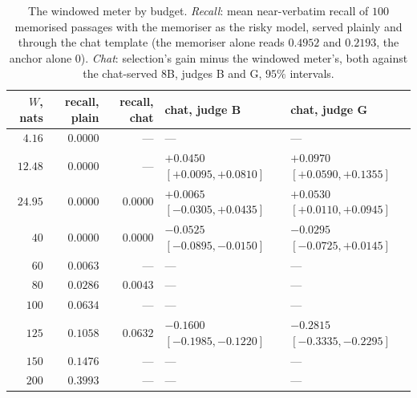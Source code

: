 \begin{table}[ht]
\centering\footnotesize
\caption{The windowed meter by budget. \emph{Recall}: mean near-verbatim recall of $100$ memorised passages
with the memoriser as the risky model, served plainly and through the chat template (the memoriser alone
reads $0.4952$ and $0.2193$, the anchor alone $0$). \emph{Chat}: selection's gain minus the windowed meter's,
both against the chat-served $8$B, judges B and G, $95\%$ intervals.}
\label{tab:windowed}
\setlength{\tabcolsep}{4pt}
\begin{tabular}{@{}rrrll@{}}
\toprule
$W$, nats & recall, plain & recall, chat & chat, judge B & chat, judge G \\
\midrule
$4.16$ & $0.0000$ & --- & --- & --- \\
$12.48$ & $0.0000$ & --- & $+0.0450$ $[+0.0095, +0.0810]$ & $+0.0970$ $[+0.0590, +0.1355]$ \\
$24.95$ & $0.0000$ & $0.0000$ & $+0.0065$ $[-0.0305, +0.0435]$ & $+0.0530$ $[+0.0110, +0.0945]$ \\
$40$ & $0.0000$ & $0.0000$ & $-0.0525$ $[-0.0895, -0.0150]$ & $-0.0295$ $[-0.0725, +0.0145]$ \\
$60$ & $0.0063$ & --- & --- & --- \\
$80$ & $0.0286$ & $0.0043$ & --- & --- \\
$100$ & $0.0634$ & --- & --- & --- \\
$125$ & $0.1058$ & $0.0632$ & $-0.1600$ $[-0.1985, -0.1220]$ & $-0.2815$ $[-0.3335, -0.2295]$ \\
$150$ & $0.1476$ & --- & --- & --- \\
$200$ & $0.3993$ & --- & --- & --- \\
\bottomrule
\end{tabular}
\end{table}

